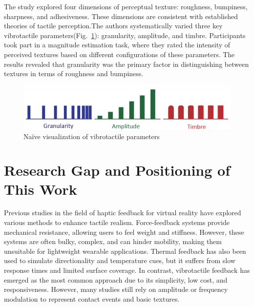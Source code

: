 The study\cite{6216375} explored four dimensions of perceptual texture: roughness, bumpiness, sharpness, and adhesiveness. These dimensions are consistent with established theories of tactile perception.The authors systematically varied three key vibrotactile parameters(Fig.~\ref{fig:Texture_Rendering_2}): granularity, amplitude, and timbre. Participants took part in a magnitude estimation task, where they rated the intensity of perceived textures based on different configurations of these parameters. The results revealed that granularity was the primary factor in distinguishing between textures in terms of roughness and bumpiness.

\begin{figure}[H]\centering
	\includegraphics[width=1\textwidth]{Pictures/Texture_Rendering_2.png}%
	\caption{Naïve visualization of vibrotactile parameters\cite{10.1145/3025453.3025812}}\label{fig:Texture_Rendering_2}%
\end{figure}


\section{Research Gap and Positioning of This Work}
Previous studies in the field of haptic feedback for virtual reality have explored various methods to enhance tactile realism. Force-feedback systems provide mechanical resistance, allowing users to feel weight and stiffness. However, these systems are often bulky, complex, and can hinder mobility, making them unsuitable for lightweight wearable applications. Thermal feedback has also been used to simulate directionality and temperature cues, but it suffers from slow response times and limited surface coverage. In contrast, vibrotactile feedback has emerged as the most common approach due to its simplicity, low cost, and responsiveness. However, many studies still rely on amplitude or frequency modulation to represent contact events and basic textures.

